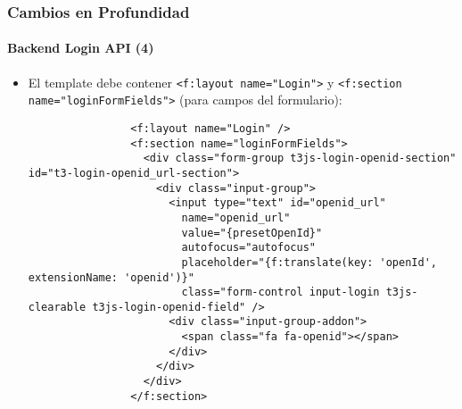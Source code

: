 \begin{frame}[fragile]
	\frametitle{Cambios en Profundidad}
	\framesubtitle{Backend Login API (4)}

	\lstset{basicstyle=\tiny\ttfamily}

	\begin{itemize}

		\item El template debe contener \texttt{<f:layout name="Login">} y
			\texttt{<f:section name="loginFormFields">} (para campos del formulario):

			\begin{lstlisting}
				<f:layout name="Login" />
				<f:section name="loginFormFields">
				  <div class="form-group t3js-login-openid-section" id="t3-login-openid_url-section">
				    <div class="input-group">
				      <input type="text" id="openid_url"
				        name="openid_url"
				        value="{presetOpenId}"
				        autofocus="autofocus"
				        placeholder="{f:translate(key: 'openId', extensionName: 'openid')}"
				        class="form-control input-login t3js-clearable t3js-login-openid-field" />
				      <div class="input-group-addon">
				        <span class="fa fa-openid"></span>
				      </div>
				    </div>
				  </div>
				</f:section>
			\end{lstlisting}

	\end{itemize}

\end{frame}


